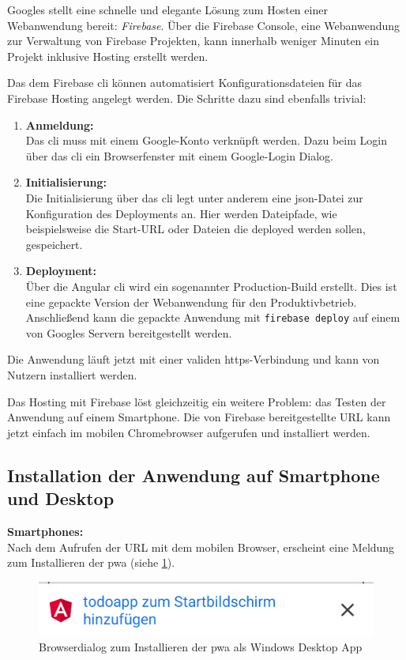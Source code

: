 Googles stellt eine schnelle und elegante Lösung zum Hosten einer Webanwendung bereit: \textit{Firebase}. Über die Firebase Console, eine Webanwendung zur Verwaltung von Firebase Projekten, kann innerhalb weniger Minuten ein Projekt inklusive Hosting erstellt werden. 



Das dem Firebase \ac{cli} können automatisiert Konfigurationsdateien für das Firebase Hosting angelegt werden. Die Schritte dazu sind ebenfalls trivial:
\begin{enumerate}
	\item \textbf{Anmeldung: \\}
	      Das \ac{cli} muss mit einem Google-Konto verknüpft werden. Dazu beim Login über das \ac{cli} ein Browserfenster mit einem Google-Login Dialog.
	\item \textbf{Initialisierung: \\}
	      Die Initialisierung über das \ac{cli} legt unter anderem eine \ac{json}-Datei zur Konfiguration des Deployments an. Hier werden Dateipfade, wie beispielsweise die Start-URL oder Dateien die deployed werden sollen, gespeichert.
	\item \textbf{Deployment: \\}
	      Über die Angular \ac{cli} wird ein sogenannter Production-Build erstellt. Dies ist eine gepackte Version der Webanwendung für den Produktivbetrieb.
	      Anschließend kann die gepackte Anwendung mit \texttt{firebase deploy} auf einem von Googles Servern bereitgestellt werden.
\end{enumerate}

Die Anwendung läuft jetzt mit einer validen \ac{https}-Verbindung und kann von Nutzern installiert werden.

Das Hosting mit Firebase löst gleichzeitig ein weitere Problem: das Testen der Anwendung auf einem Smartphone. Die von Firebase bereitgestellte URL kann jetzt einfach im mobilen Chromebrowser aufgerufen und installiert werden.

\subsection{Installation der Anwendung auf Smartphone und Desktop}
\textbf{Smartphones:}\\
Nach dem Aufrufen der URL mit dem mobilen Browser, erscheint eine Meldung zum Installieren der \ac{pwa} (siehe \ref{fig:dialog_install_pwa_mobile}).

\begin{figure}[h]
	\includegraphics[scale=0.5]{img/pwa_add_to_homescreen.png}
	\centering
	\caption{Browserdialog zum Installieren der \ac{pwa} als Windows Desktop App}
	\label{fig:dialog_install_pwa_mobile}
\end{figure}

